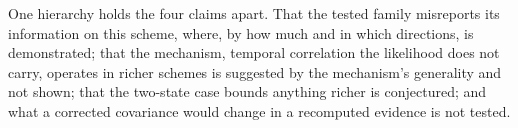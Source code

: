 One hierarchy holds the four claims apart. That the tested family misreports its information on this scheme, where, by how much and in which directions, is demonstrated; that the mechanism, temporal correlation the likelihood does not carry, operates in richer schemes is suggested by the mechanism's generality and not shown; that the two-state case bounds anything richer is conjectured; and what a corrected covariance would change in a recomputed evidence is not tested.

